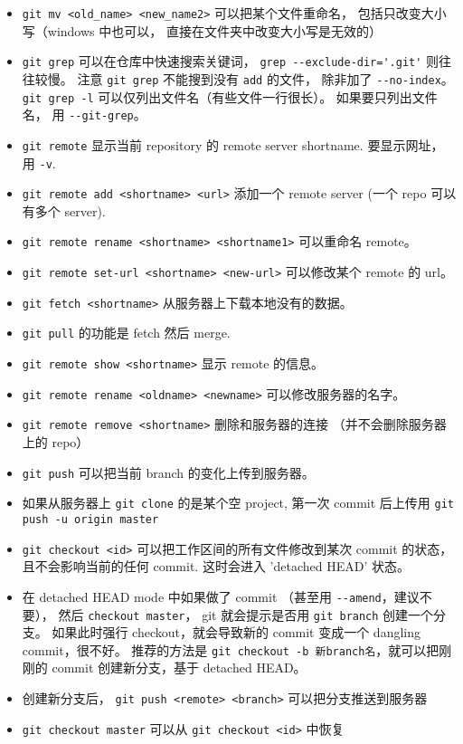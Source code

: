 \begin{itemize}
\item \verb`git mv <old_name> <new_name2>` 可以把某个文件重命名， 包括只改变大小写（windows 中也可以， 直接在文件夹中改变大小写是无效的）
\item \verb`git grep` 可以在仓库中快速搜索关键词， \verb`grep --exclude-dir='.git'` 则往往较慢。 注意 \verb`git grep` 不能搜到没有 \verb`add` 的文件， 除非加了 \verb`--no-index`。 \verb`git grep -l` 可以仅列出文件名（有些文件一行很长）。 如果要只列出文件名， 用 \verb`--git-grep`。
\item \verb`git remote` 显示当前 repository 的 remote server shortname. 要显示网址， 用 \verb`-v`.
\item \verb`git remote add <shortname> <url>` 添加一个 remote server (一个 repo 可以有多个 server).
\item \verb`git remote rename <shortname> <shortname1>` 可以重命名 remote。
\item \verb`git remote set-url <shortname> <new-url>` 可以修改某个 remote 的 url。
\item \verb`git fetch <shortname>` 从服务器上下载本地没有的数据。
\item \verb`git pull` 的功能是 fetch 然后 merge.
\item \verb`git remote show <shortname>` 显示 remote 的信息。
\item \verb`git remote rename <oldname> <newname>` 可以修改服务器的名字。
\item \verb`git remote remove <shortname>` 删除和服务器的连接 （并不会删除服务器上的 repo）
\item \verb`git push` 可以把当前 branch 的变化上传到服务器。
\item 如果从服务器上 \verb`git clone` 的是某个空 project, 第一次 commit 后上传用 \verb`git push -u origin master`
\item \verb`git checkout <id>` 可以把工作区间的所有文件修改到某次 commit 的状态， 且不会影响当前的任何 commit. 这时会进入 'detached HEAD' 状态。
\item 在 detached HEAD mode 中如果做了 commit （甚至用 \verb`--amend`，建议不要）， 然后 \verb`checkout master`， git 就会提示是否用 \verb`git branch` 创建一个分支。 如果此时强行 checkout，就会导致新的 commit 变成一个 dangling commit，很不好。 推荐的方法是 \verb`git checkout -b 新branch名`，就可以把刚刚的 commit 创建新分支，基于 detached HEAD。
\item 创建新分支后， \verb`git push <remote> <branch>` 可以把分支推送到服务器
\item \verb`git checkout master` 可以从 \verb`git checkout <id>` 中恢复

\end{itemize}
